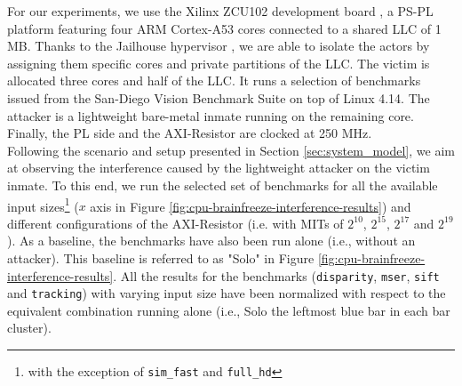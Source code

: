 %

    For our experiments, we use the Xilinx ZCU102 development board \cite{Xilinx-ULTRASCALE-TRM}, a PS-PL platform featuring four ARM Cortex-A53 cores \cite{ARM-cortex-A53} connected to a shared LLC of 1 MB.
    Thanks to the Jailhouse hypervisor \cite{ewarp2020rtss}, we are able to isolate the actors by assigning them specific cores and private partitions of the LLC.
    The victim is allocated three cores and half of the LLC.
    It runs a selection of benchmarks issued from the San-Diego Vision Benchmark Suite \cite{SD-VBS} on top of Linux 4.14.
    The attacker is a lightweight bare-metal inmate running on the remaining core.
    Finally, the PL side and the AXI-Resistor are clocked at 250 MHz.\\

    Following the scenario and setup presented in Section \ref{sec:system_model}, we aim at observing the interference caused by the lightweight attacker on the victim inmate.
    To this end, we run the selected set of benchmarks for all the available input sizes\footnote{with the exception of \texttt{sim\_fast} and \texttt{full\_hd}} ($x$ axis in Figure \ref{fig:cpu-brainfreeze-interference-results}) and different configurations of the AXI-Resistor (i.e. with MITs of $2^{10}$, $2^{15}$, $2^{17}$ and $2^{19}$).
    As a baseline, the benchmarks have also been run alone (i.e., without an attacker).
    This baseline is referred to as "Solo" in Figure \ref{fig:cpu-brainfreeze-interference-results}.
    All the results for the benchmarks (\texttt{disparity}, \texttt{mser}, \texttt{sift} and \texttt{tracking}) with varying input size have been normalized with respect to the equivalent combination running alone (i.e., Solo the leftmost blue bar in each bar cluster).

